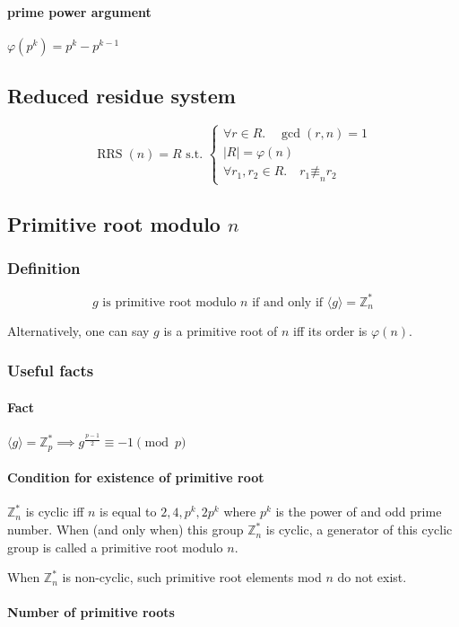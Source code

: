 \documentclass{article}
\begin{document}
\paragraph{prime power argument} $φ(p^k) = p^k - p^{k-1}$

\subsection{Reduced residue system}
$$\operatorname{RRS}(n) = R\textrm{ s.t. }
\begin{cases}
	∀r ∈ R.\quad \gcd(r,n)  = 1\\
	|R| = φ(n)\\
	∀r_1,r_2 ∈ R.\quad r_1 \not≡_n r_2
\end{cases}$$

\subsection{Primitive root modulo $n$}

\subsubsection{Definition}
$$g\textrm{ is primitive root modulo } n\textrm{ if and only if } ⟨g⟩ = ℤ^*_n$$

Alternatively, one can say $g$ is a primitive root of $n$ iff its order is $φ(n)$.

\subsubsection{Useful facts}
\paragraph{Fact} $⟨g⟩ = ℤ^*_p ⟹ g^{\frac{p-1}{2}} ≡ -1 \pmod p$

\paragraph{Condition for existence of primitive root}

$ℤ_n^*$ is cyclic iff $n$ is equal to $2,4,p^k,2p^k$ where $p^k$ is the power of and odd prime number. When (and only when) this group $ℤ_n^*$ is cyclic, a generator of this cyclic group is called a primitive root modulo $n$.

When $ℤ_n^*$ is non-cyclic, such primitive root elements mod $n$ do not exist.

\paragraph{Number of primitive roots}
\end{document}
